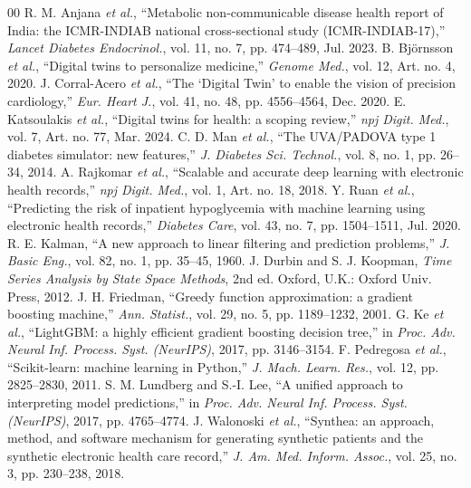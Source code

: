 \documentclass[conference]{IEEEtran}
\begin{document}
\begin{thebibliography}{00}
 R. M. Anjana \textit{et al.}, ``Metabolic non-communicable disease health report of India: the ICMR-INDIAB national cross-sectional study (ICMR-INDIAB-17),'' \textit{Lancet Diabetes Endocrinol.}, vol. 11, no. 7, pp. 474--489, Jul. 2023.
 B. Bj\"{o}rnsson \textit{et al.}, ``Digital twins to personalize medicine,'' \textit{Genome Med.}, vol. 12, Art. no. 4, 2020.
 J. Corral-Acero \textit{et al.}, ``The `Digital Twin' to enable the vision of precision cardiology,'' \textit{Eur. Heart J.}, vol. 41, no. 48, pp. 4556--4564, Dec. 2020.
 E. Katsoulakis \textit{et al.}, ``Digital twins for health: a scoping review,'' \textit{npj Digit. Med.}, vol. 7, Art. no. 77, Mar. 2024.
 C. D. Man \textit{et al.}, ``The UVA/PADOVA type 1 diabetes simulator: new features,'' \textit{J. Diabetes Sci. Technol.}, vol. 8, no. 1, pp. 26--34, 2014.
 A. Rajkomar \textit{et al.}, ``Scalable and accurate deep learning with electronic health records,'' \textit{npj Digit. Med.}, vol. 1, Art. no. 18, 2018.
 Y. Ruan \textit{et al.}, ``Predicting the risk of inpatient hypoglycemia with machine learning using electronic health records,'' \textit{Diabetes Care}, vol. 43, no. 7, pp. 1504--1511, Jul. 2020.
 R. E. Kalman, ``A new approach to linear filtering and prediction problems,'' \textit{J. Basic Eng.}, vol. 82, no. 1, pp. 35--45, 1960.
 J. Durbin and S. J. Koopman, \textit{Time Series Analysis by State Space Methods}, 2nd ed. Oxford, U.K.: Oxford Univ. Press, 2012.
 J. H. Friedman, ``Greedy function approximation: a gradient boosting machine,'' \textit{Ann. Statist.}, vol. 29, no. 5, pp. 1189--1232, 2001.
 G. Ke \textit{et al.}, ``LightGBM: a highly efficient gradient boosting decision tree,'' in \textit{Proc. Adv. Neural Inf. Process. Syst. (NeurIPS)}, 2017, pp. 3146--3154.
 F. Pedregosa \textit{et al.}, ``Scikit-learn: machine learning in Python,'' \textit{J. Mach. Learn. Res.}, vol. 12, pp. 2825--2830, 2011.
 S. M. Lundberg and S.-I. Lee, ``A unified approach to interpreting model predictions,'' in \textit{Proc. Adv. Neural Inf. Process. Syst. (NeurIPS)}, 2017, pp. 4765--4774.
 J. Walonoski \textit{et al.}, ``Synthea: an approach, method, and software mechanism for generating synthetic patients and the synthetic electronic health care record,'' \textit{J. Am. Med. Inform. Assoc.}, vol. 25, no. 3, pp. 230--238, 2018.

\end{thebibliography}
\end{document}
